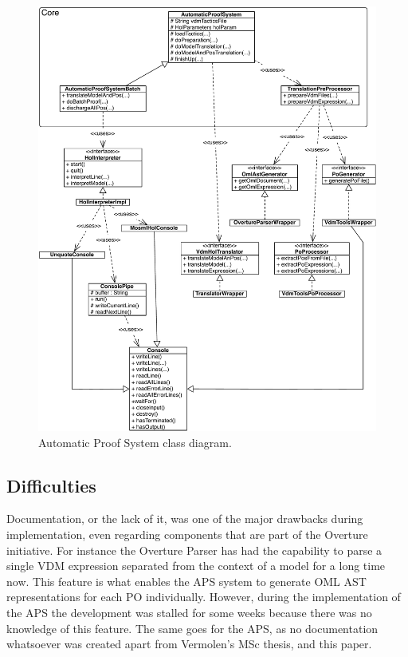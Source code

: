 \documentclass[]{article}
\begin{document}
\begin{figure}%
    \includegraphics[width=\textwidth]{images/aps_class_diagram.pdf}
    \caption[APS class diagram]{Automatic Proof System class diagram.}
    \label{fig:aps_class}
\end{figure}


\subsection{Difficulties}
\label{sub:implementation_difficulties}

Documentation, or the lack of it, was one of the major drawbacks during implementation, even regarding components that are part of the Overture initiative.
For instance the Overture Parser has had the capability to parse a single VDM expression separated from the context of a model for a long time now.
This feature is what enables the APS system to generate OML AST representations for each PO individually.
However, during the implementation of the APS the development was stalled for some weeks because there was no knowledge of this feature.
The same goes for the APS, as no documentation whatsoever was created apart from Vermolen's MSc thesis, and this paper.
\end{document}
